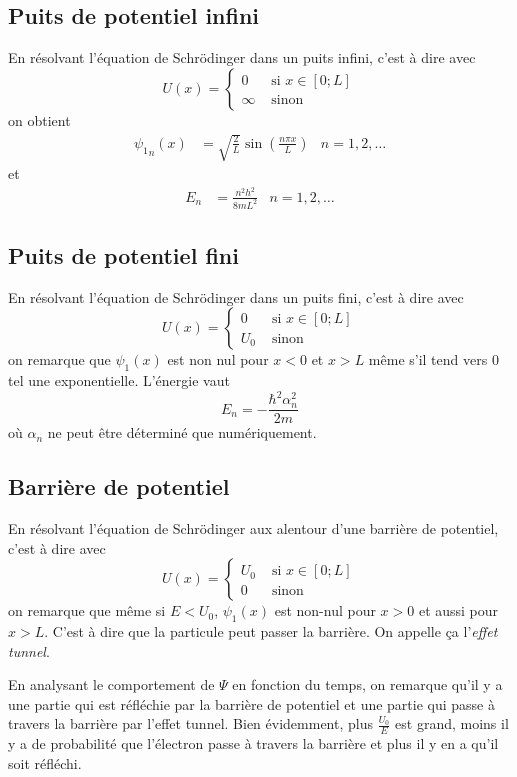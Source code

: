 \subsection{Puits de potentiel infini}
En résolvant l'équation de Schrödinger dans un puits infini,
c'est à dire avec
\[ U(x) = \left\{
  \begin{aligned}
    0 & \text{ si } x \in [0; L]\\
    \infty & \text{ sinon}
  \end{aligned}
\right. \]
on obtient
\begin{align*}
  {\psi_1}_n(x) & =
  \sqrt{\frac{2}{L}}\sin\left(\frac{n\pi x}{L}\right) & n = 1, 2, \ldots
\end{align*}
et
\begin{align*}
  E_n & = \frac{n^2h^2}{8mL^2} & n = 1, 2, \ldots
\end{align*}

\subsection{Puits de potentiel fini}
En résolvant l'équation de Schrödinger dans un puits fini,
c'est à dire avec
\[ U(x) = \left\{
  \begin{aligned}
    0 & \text{ si } x \in [0; L]\\
    U_0 & \text{ sinon}
  \end{aligned}
\right. \]
on remarque que $\psi_1(x)$ est non nul pour $x < 0$ et $x > L$
même s'il tend vers 0 tel une exponentielle.
L'énergie vaut
\[
  E_n = -\frac{\hbar^2\alpha_n^2}{2m}
\]
où $\alpha_n$ ne peut être déterminé que numériquement.

\subsection{Barrière de potentiel}
En résolvant l'équation de Schrödinger
aux alentour d'une barrière de potentiel,
c'est à dire avec
\[ U(x) = \left\{
  \begin{aligned}
    U_0 & \text{ si } x \in [0; L]\\
    0 & \text{ sinon}
  \end{aligned}
\right. \]
on remarque que même si $E < U_0$,
$\psi_1(x)$ est non-nul pour $x > 0$ et aussi pour $x > L$.
C'est à dire que la particule peut passer la barrière.
On appelle ça l'\emph{effet tunnel}.

En analysant le comportement de $\Psi$ en fonction du temps,
on remarque qu'il y a
une partie qui est réfléchie par la barrière de potentiel et
une partie qui passe à travers la barrière par l'effet tunnel.
Bien évidemment, plus $\frac{U_0}{E}$ est grand,
moins il y a de probabilité que l'électron passe à travers la barrière
et plus il y en a qu'il soit réfléchi.

